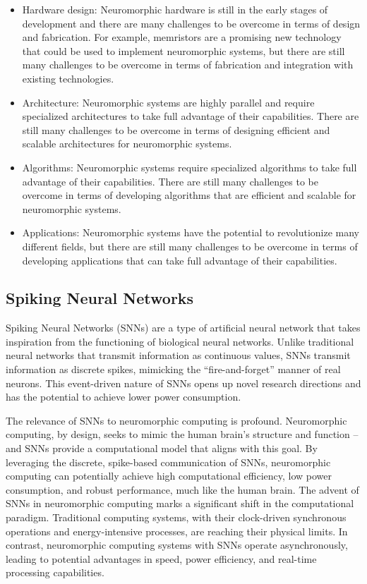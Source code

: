 \documentclass[screen, acmtog]{acmart}
\begin{document}
\begin{itemize}
    \item Hardware design: Neuromorphic hardware is still in the early stages of development and there are many challenges to be overcome in terms of design and fabrication. For example, memristors are a promising new technology that could be used to implement neuromorphic systems, but there are still many challenges to be overcome in terms of fabrication and integration with existing technologies.
    \item Architecture: Neuromorphic systems are highly parallel and require specialized architectures to take full advantage of their capabilities. There are still many challenges to be overcome in terms of designing efficient and scalable architectures for neuromorphic systems.
    \item Algorithms: Neuromorphic systems require specialized algorithms to take full advantage of their capabilities. There are still many challenges to be overcome in terms of developing algorithms that are efficient and scalable for neuromorphic systems.
    \item Applications: Neuromorphic systems have the potential to revolutionize many different fields, but there are still many challenges to be overcome in terms of developing applications that can take full advantage of their capabilities.
\end{itemize}

\subsection{Spiking Neural Networks}

Spiking Neural Networks (SNNs) are a type of artificial neural network that takes inspiration from the functioning of biological neural networks. Unlike traditional neural networks that transmit information as continuous values, SNNs transmit information as discrete spikes, mimicking the “fire-and-forget” manner of real neurons. This event-driven nature of SNNs opens up novel research directions and has the potential to achieve lower power consumption.

The relevance of SNNs to neuromorphic computing is profound. Neuromorphic computing, by design, seeks to mimic the human brain’s structure and function – and SNNs provide a computational model that aligns with this goal. By leveraging the discrete, spike-based communication of SNNs, neuromorphic computing can potentially achieve high computational efficiency, low power consumption, and robust performance, much like the human brain. The advent of SNNs in neuromorphic computing marks a significant shift in the computational paradigm. Traditional computing systems, with their clock-driven synchronous operations and energy-intensive processes, are reaching their physical limits. In contrast, neuromorphic computing systems with SNNs operate asynchronously, leading to potential advantages in speed, power efficiency, and real-time processing capabilities.
\end{document}
